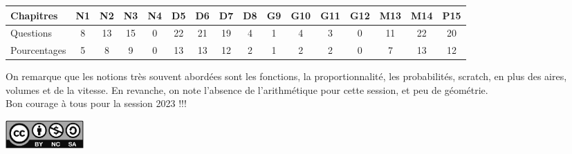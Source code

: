    \begin{center}
      {
      \begin{tabular}{|p{2.3cm}|*{15}{C{0.5}|}}
         \hline
         Chapitres & N1 & N2 & N3 & N4 & D5 & D6 & D7 & D8 & G9 & \!G10 & \!G11 & \!G12 & \!M13 & \!M14 & \!P15 \\
         \hline
         Questions & 8 & 13 & 15 & 0 & 22 & 21 & 19 & 4 & 1 & 4 & 3 & 0 & 11 & 22 & 20 \\
         \hline
         Pourcentages & 5 & 8 & 9 & 0 & 13 & 13 & 12 & 2  & 1 & 2 & 2 & 0 & 7 & 13 & 12 \\
         \hline
      \end{tabular}}
   \end{center}

On remarque que les notions très souvent abordées sont les fonctions, la proportionnalité, les probabilités, scratch, en plus des aires, volumes et de la vitesse. En revanche, on note l'absence de l'arithmétique pour cette session, et peu de géométrie. \\

Bon courage à tous pour la session 2023 !!! \\

\begin{center}
   \includegraphics[width=3cm]{Annexes/Images/Licence}
\end{center}


